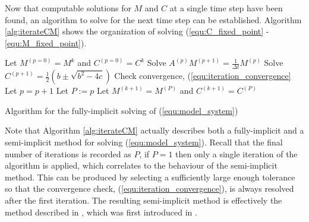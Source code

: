 Now that computable solutions for $M$ and $C$ at a single time step have been found, an algorithm to solve for the next time step can be established.
Algorithm \ref{alg:iterateCM} shows the organization of solving (\ref{equ:C_fixed_point} - \ref{equ:M_fixed_point}). 
\begin{algorithm}
  \Begin
  {
    Let $M^{(p=0)} = M^{k}$ and $C^{(p=0)} = C^{k}$\;
    {
        Solve $A^{(p)} M^{(p+1)} = \frac{1}{\Delta t}M^{(p)}$\;
        Solve $C^{(p+1)} = \frac{1}{2} \left( b \pm \sqrt{b^2 - 4c} \right)$\;
        Check convergence, (\ref{equ:iteration_convergence}\; 
        Let $p = p + 1 $\;
    }
    Let $P := p$\;
    Let $M^{(k+1)} = M^{(P)}$ and $C^{(k+1)} = C^{(P)}$\;
  }
  \caption{Algorithm for the fully-implicit solving of (\ref{equ:model_system}) }
  \label{alg:iterateCM}
\end{algorithm}

Note that Algorithm \ref{alg:iterateCM} actually describes both a fully-implicit and a semi-implicit method for solving (\ref{equ:model_system}). 
Recall that the final number of iterations is recorded as $P$, if $P = 1$ then only a single iteration of the algorithm is applied, which correlates to the behaviour of the semi-implicit method.
This can be produced by selecting a sufficiently large enough tolerance so that the convergence check, (\ref{equ:iteration_convergence}), is always resolved after the first iteration.
The resulting semi-implicit method is effectively the method described in \cite{sirca2012computational}, which was first introduced in \cite{eberl2007finite}.



